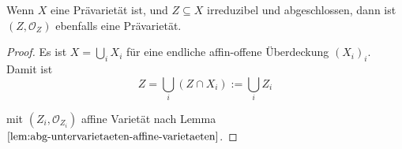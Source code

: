 \begin{cor}[orig. 47]
  \label{cor:abg-untervarietaeten-sind-praevarietaeten}
  Wenn $X$ eine Prävarietät ist, und $Z\subseteq X$ irreduzibel und abgeschlossen, dann ist $(Z,\mathcal{O}_{Z})$ ebenfalls eine Prävarietät.
\end{cor}
\begin{proof}
  Es ist $X=\bigcup_{i}X_{i}$ für eine endliche affin-offene Überdeckung $(X_{i})_{i}$.
  Damit ist 
  \[
    Z=\bigcup_{i}\left(Z\cap X_{i}\right) :=\bigcup_{i} Z_{i}
  \]
  

  mit $(Z_{i}, \mathcal{O}_{Z_{i}})$ affine Varietät nach Lemma $\ref{lem:abg-untervarietaeten-affine-varietaeten}$.
\end{proof}

